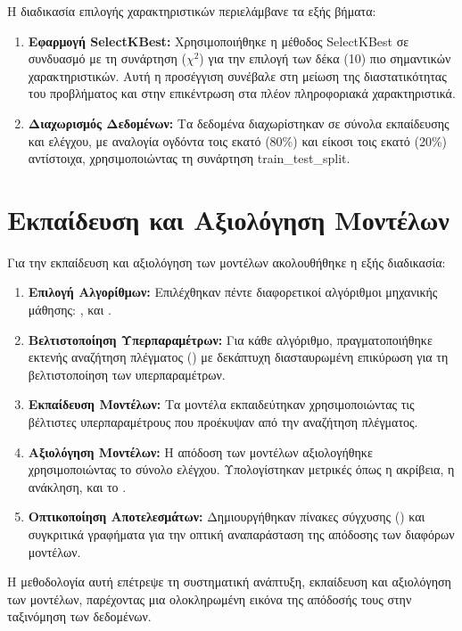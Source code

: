 Η διαδικασία επιλογής χαρακτηριστικών περιελάμβανε τα εξής βήματα:
\begin{enumerate}
  \item
    \textbf{Εφαρμογή \textlatin{SelectKBest}:} Χρησιμοποιήθηκε η μέθοδος
    \textlatin{SelectKBest} σε συνδυασμό με τη συνάρτηση (${\chi}^2$) για
    την επιλογή των δέκα (10) πιο σημαντικών χαρακτηριστικών. Αυτή η
    προσέγγιση συνέβαλε στη μείωση της διαστατικότητας του προβλήματος και
    στην επικέντρωση στα πλέον πληροφοριακά χαρακτηριστικά.

  \item
    \textbf{Διαχωρισμός Δεδομένων:} Τα δεδομένα διαχωρίστηκαν σε σύνολα
    εκπαίδευσης και ελέγχου, με αναλογία ογδόντα τοις εκατό (80\%) και
    είκοσι τοις εκατό (20\%) αντίστοιχα, χρησιμοποιώντας τη συνάρτηση
    \textlatin{train\_test\_split}.
\end{enumerate}

\section{Εκπαίδευση και Αξιολόγηση Μοντέλων}

Για την εκπαίδευση και αξιολόγηση των μοντέλων ακολουθήθηκε η εξής
διαδικασία:
\begin{enumerate}
  \item
    \textbf{Επιλογή Αλγορίθμων:} Επιλέχθηκαν πέντε  διαφορετικοί
    αλγόριθμοι μηχανικής μάθησης: , και .
  \item
    \textbf{Βελτιστοποίηση Υπερπαραμέτρων:} Για κάθε αλγόριθμο,
    πραγματοποιήθηκε εκτενής αναζήτηση πλέγματος () με
    δεκάπτυχη διασταυρωμένη επικύρωση για τη βελτιστοποίηση των
    υπερπαραμέτρων.

  \item
    \textbf{Εκπαίδευση Μοντέλων:} Τα μοντέλα εκπαιδεύτηκαν χρησιμοποιώντας
    τις βέλτιστες υπερπαραμέτρους που προέκυψαν από την αναζήτηση
    πλέγματος.

  \item
    \textbf{Αξιολόγηση Μοντέλων:} Η απόδοση των μοντέλων αξιολογήθηκε
    χρησιμοποιώντας το σύνολο ελέγχου. Υπολογίστηκαν μετρικές όπως η
    ακρίβεια, η ανάκληση, και το .

  \item
    \textbf{Οπτικοποίηση Αποτελεσμάτων:} Δημιουργήθηκαν πίνακες σύγχυσης
    () και συγκριτικά γραφήματα για την οπτική
    αναπαράσταση της απόδοσης των διαφόρων μοντέλων.
\end{enumerate}
Η μεθοδολογία αυτή επέτρεψε τη συστηματική ανάπτυξη, εκπαίδευση και
αξιολόγηση των μοντέλων, παρέχοντας μια ολοκληρωμένη εικόνα της απόδοσής
τους στην ταξινόμηση των δεδομένων.


